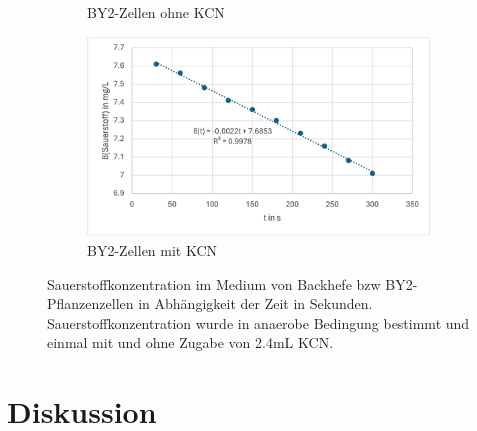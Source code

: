 \documentclass[10pt,a4paper]{article}
\begin{document}
\begin{figure}[H]
\begin{subfigure}[b]{0.6\textwidth}
					\caption{BY2-Zellen ohne KCN}
					\label{fig:BY2ohneKCN}
				\end{subfigure}
				\hfill
				\begin{subfigure}[b]{0.6\textwidth}
					\includegraphics[width=\textwidth]{O2BY2mitKCN.png}
					\caption{BY2-Zellen mit KCN}
					\label{fig:BY2mitKCN}
				\end{subfigure}
				\caption{Sauerstoffkonzentration im Medium von Backhefe bzw BY2-Pflanzenzellen in Abhängigkeit der Zeit in Sekunden. Sauerstoffkonzentration wurde in anaerobe Bedingung bestimmt und einmal mit und ohne Zugabe von 2.4mL KCN.}
				\label{fig: Sauerstoffverbrauch}
			\end{figure}
		

	
	\section{Diskussion}
\end{document}
